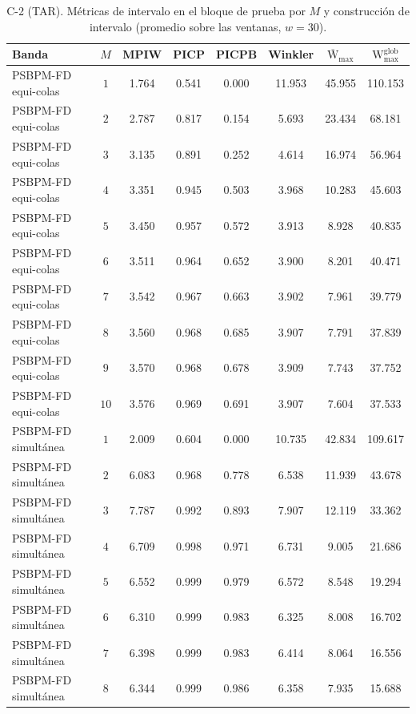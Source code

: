 \begin{table}[H]
\centering\footnotesize
\caption{C-2 (TAR). Métricas de intervalo en el bloque de prueba por $M$ y construcción de intervalo (promedio sobre las ventanas, $w = 30$).}
\label{tab:aneB_B_C2}
\begin{tabular}{l c cccccc}
\hline
 Banda & $M$ & MPIW & PICP & PICPB & Winkler & $\overline{\mathrm{W}}_{\max}$ & $\mathrm{W}_{\max}^{\mathrm{glob}}$ \\
\hline
PSBPM-FD equi-colas & $1$ & 1.764 & 0.541 & 0.000 & 11.953 & 45.955 & 110.153 \\
PSBPM-FD equi-colas & $2$ & 2.787 & 0.817 & 0.154 & 5.693 & 23.434 & 68.181 \\
PSBPM-FD equi-colas & $3$ & 3.135 & 0.891 & 0.252 & 4.614 & 16.974 & 56.964 \\
PSBPM-FD equi-colas & $4$ & 3.351 & 0.945 & 0.503 & 3.968 & 10.283 & 45.603 \\
PSBPM-FD equi-colas & $5$ & 3.450 & 0.957 & 0.572 & 3.913 & 8.928 & 40.835 \\
PSBPM-FD equi-colas & $6$ & 3.511 & 0.964 & 0.652 & 3.900 & 8.201 & 40.471 \\
PSBPM-FD equi-colas & $7$ & 3.542 & 0.967 & 0.663 & 3.902 & 7.961 & 39.779 \\
PSBPM-FD equi-colas & $8$ & 3.560 & 0.968 & 0.685 & 3.907 & 7.791 & 37.839 \\
PSBPM-FD equi-colas & $9$ & 3.570 & 0.968 & 0.678 & 3.909 & 7.743 & 37.752 \\
PSBPM-FD equi-colas & $10$ & 3.576 & 0.969 & 0.691 & 3.907 & 7.604 & 37.533 \\
\hline
PSBPM-FD simultánea & $1$ & 2.009 & 0.604 & 0.000 & 10.735 & 42.834 & 109.617 \\
PSBPM-FD simultánea & $2$ & 6.083 & 0.968 & 0.778 & 6.538 & 11.939 & 43.678 \\
PSBPM-FD simultánea & $3$ & 7.787 & 0.992 & 0.893 & 7.907 & 12.119 & 33.362 \\
PSBPM-FD simultánea & $4$ & 6.709 & 0.998 & 0.971 & 6.731 & 9.005 & 21.686 \\
PSBPM-FD simultánea & $5$ & 6.552 & 0.999 & 0.979 & 6.572 & 8.548 & 19.294 \\
PSBPM-FD simultánea & $6$ & 6.310 & 0.999 & 0.983 & 6.325 & 8.008 & 16.702 \\
PSBPM-FD simultánea & $7$ & 6.398 & 0.999 & 0.983 & 6.414 & 8.064 & 16.556 \\
PSBPM-FD simultánea & $8$ & 6.344 & 0.999 & 0.986 & 6.358 & 7.935 & 15.688 \\

\end{tabular}
\end{table}
